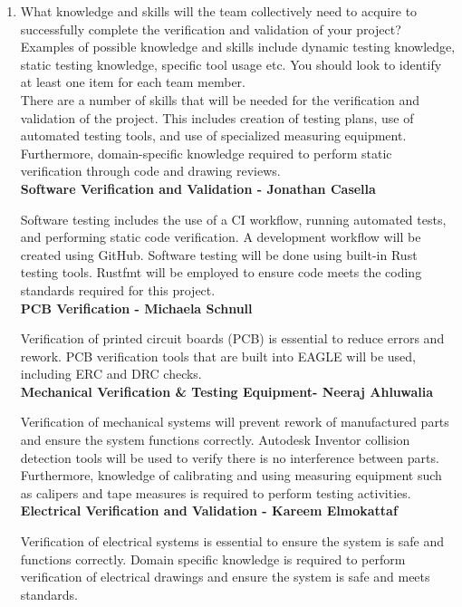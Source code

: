\documentclass[12pt, titlepage]{article}
\begin{document}
\begin{enumerate}
  \item What knowledge and skills will the team collectively need to acquire to
  successfully complete the verification and validation of your project?
  Examples of possible knowledge and skills include dynamic testing knowledge,
  static testing knowledge, specific tool usage etc.  You should look to
  identify at least one item for each team member.\\
  
 There are a number of skills that will be needed for the verification and validation of the project. This includes creation of testing plans, use of automated testing tools, and use of specialized measuring equipment. Furthermore, domain-specific knowledge required to perform static verification through code and drawing reviews.\\
 
 \textbf{Software Verification and Validation - Jonathan Casella}
 
 Software testing includes the use of a CI workflow, running automated tests, and performing static code verification. A development workflow will be created using GitHub. Software testing will be done using built-in Rust testing tools. Rustfmt will be employed to ensure code meets the coding standards required for this project.\\
 
 \textbf{PCB Verification - Michaela Schnull}
 
 Verification of printed circuit boards (PCB) is essential to reduce errors and rework. PCB verification tools that are built into EAGLE will be used, including ERC and DRC checks.\\
 
 \textbf{Mechanical Verification \& Testing Equipment- Neeraj Ahluwalia}
 
 Verification of mechanical systems will prevent rework of manufactured parts and ensure the system functions correctly. Autodesk Inventor collision detection tools will be used to verify there is no interference between parts. Furthermore, knowledge of calibrating and using measuring equipment such as calipers and tape measures is required to perform testing activities.\\ 
 
 \textbf{Electrical Verification and Validation - Kareem Elmokattaf}
 
 Verification of electrical systems is essential to ensure the system is safe and functions correctly. Domain specific knowledge is required to perform verification of electrical drawings and  ensure the system is safe and meets standards.\\
  

\end{enumerate}
\end{document}
